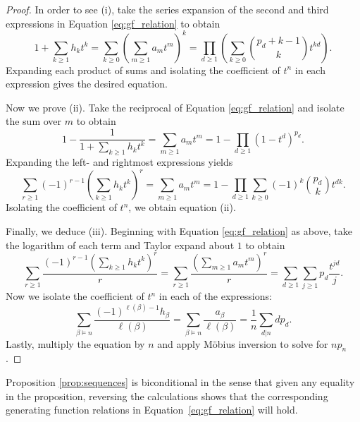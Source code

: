\documentclass[11pt]{amsart}
\theoremstyle{definition}
\numberwithin{equation}{section}
\begin{document}
\begin{proof}

In order to see (i), take the series expansion of the second
and third expressions in Equation \eqref{eq:gf_relation} to obtain
\begin{equation}\label{eq:gf_relation_reciprocal}
1 + \sum_{k \geq 1} h_k t^k
= \sum_{k \geq 0} \left(\sum_{m \geq 1} a_m t^m\right)^k
= \prod_{d \geq 1} \left(\sum_{k \geq 0} \binom{p_d+k-1}{k} t^{kd}\right).
\end{equation}
Expanding each product of sums and isolating the coefficient of $t^{n}$ in each expression gives the desired equation.

Now we prove (ii).  Take the reciprocal of Equation \eqref{eq:gf_relation}
and isolate the sum over $m$ to obtain
\[
1 - \frac{1}{1 + \sum_{k \geq 1} h_k t^k} 
= \sum_{m \geq 1} a_m t^m 
= 1 - \prod_{d \geq 1} (1-t^d)^{p_d}.
\]
Expanding the left- and rightmost expressions yields
\[
\sum_{r \geq 1} (-1)^{r-1} \left(\sum_{k \geq 1} h_k t^k\right)^r
= \sum_{m \geq 1} a_m t^m
= 1 - \prod_{d \geq 1} \sum_{k \geq 0} (-1)^k \binom{p_d}{k} t^{dk}.
\]
Isolating the coefficient of $t^{n}$, we obtain equation (ii).

Finally, we deduce (iii).  Beginning with Equation \eqref{eq:gf_relation} as above,
take the logarithm of each term and Taylor expand about $1$ to obtain
\[
 \sum_{r \geq 1} \frac{(-1)^{r-1}(\sum_{k \geq 1} h_k t^k )^r}{r}
= \sum_{r \geq 1} \frac{(\sum_{m \geq 1} a_m t^m )^r}{r}
= \sum_{d \geq 1} \sum_{j \geq 1} p_d \frac{t^{jd}}{j}.
\]
Now we isolate the coefficient of $t^{n}$ in each of the expressions: 
\[
\sum_{\beta \vDash n} \frac{(-1)^{\ell(\beta)-1} h_\beta}{\ell(\beta)}
= \sum_{\beta \vDash n} \frac{a_\beta}{\ell(\beta)}
= \frac{1}{n} \sum_{d | n} d p_{d} .
\]
Lastly, multiply the equation by $n$ and apply M\"{o}bius inversion to solve for $n p_{n}$.
\end{proof}

Proposition \ref{prop:sequences} is biconditional in the sense that given any equality in the proposition, reversing the calculations shows that the corresponding generating function relations in Equation~\eqref{eq:gf_relation}
will hold.
\end{document}
